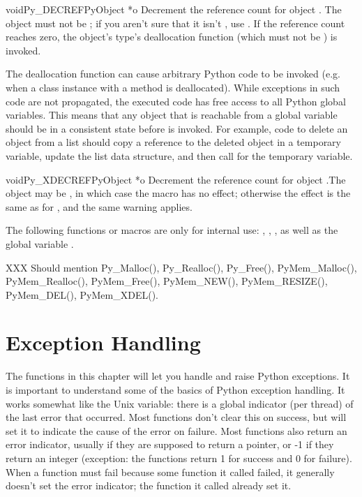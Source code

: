 \begin{cfuncdesc}{void}{Py_DECREF}{PyObject *o}
Decrement the reference count for object .  The object must
not be \NULL{}; if you aren't sure that it isn't \NULL{}, use
.  If the reference count reaches zero, the object's
type's deallocation function (which must not be \NULL{}) is invoked.

 The deallocation function can cause arbitrary Python
code to be invoked (e.g. when a class instance with a 
method is deallocated).  While exceptions in such code are not
propagated, the executed code has free access to all Python global
variables.  This means that any object that is reachable from a global
variable should be in a consistent state before  is
invoked.  For example, code to delete an object from a list should
copy a reference to the deleted object in a temporary variable, update
the list data structure, and then call  for the
temporary variable.
\end{cfuncdesc}

\begin{cfuncdesc}{void}{Py_XDECREF}{PyObject *o}
Decrement the reference count for object .The object may be
\NULL{}, in which case the macro has no effect; otherwise the
effect is the same as for , and the same warning
applies.
\end{cfuncdesc}

The following functions or macros are only for internal use:
, , ,
as well as the global variable .

XXX Should mention Py_Malloc(), Py_Realloc(), Py_Free(),
PyMem_Malloc(), PyMem_Realloc(), PyMem_Free(), PyMem_NEW(),
PyMem_RESIZE(), PyMem_DEL(), PyMem_XDEL().


\chapter{Exception Handling}

The functions in this chapter will let you handle and raise Python
exceptions.  It is important to understand some of the basics of
Python exception handling.  It works somewhat like the Unix
 variable: there is a global indicator (per thread) of the
last error that occurred.  Most functions don't clear this on success,
but will set it to indicate the cause of the error on failure.  Most
functions also return an error indicator, usually \NULL{} if they are
supposed to return a pointer, or -1 if they return an integer
(exception: the  functions return 1 for success and
0 for failure).  When a function must fail because some function it
called failed, it generally doesn't set the error indicator; the
function it called already set it.

